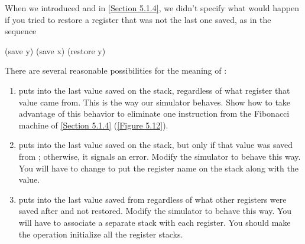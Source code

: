 \begin{exercise}
	\label{Exercise 5.11}
	When we introduced  and  in \cref{Section 5.1.4}, we didn’t specify what would happen if you tried to restore a register that was not the last one saved, as in the sequence
	\begin{scheme}
	  (save y)  (save x)  (restore y)
	\end{scheme}
	There are several reasonable possibilities for the meaning of :
	\begin{enumerate}[label = \alph*., leftmargin = *]

		\item
			 puts into  the last value saved on the stack, regardless of what register that value came from.
			This is the way our simulator behaves.
			Show how to take advantage of this behavior to eliminate one instruction from the Fibonacci machine of \cref{Section 5.1.4} (\cref{Figure 5.12}).

		\item
			 puts into  the last value saved on the stack, but only if that value was saved from ;
			otherwise, it signals an error.
			Modify the simulator to behave this way.
			You will have to change   to put the register name on the stack along with the value.

		\item
			 puts into  the last value saved from  regardless of what other registers were saved after  and not restored.
			Modify the simulator to behave this way.
			You will have to associate a separate stack with each register.
			You should make the  operation initialize all the register stacks.

	\end{enumerate}
\end{exercise}



